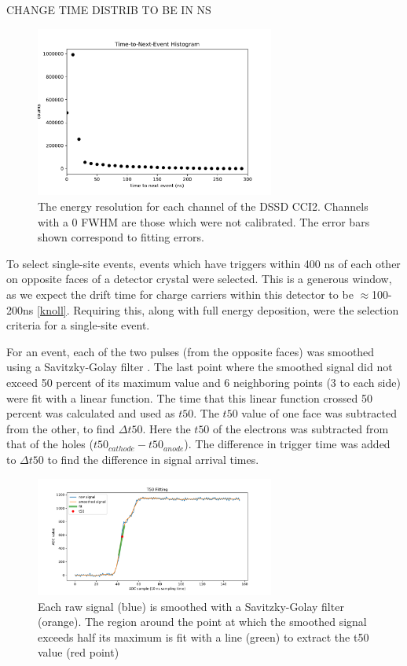 CHANGE TIME DISTRIB TO BE IN NS
\begin{figure}[h]
\begin{centering}
\includegraphics[width=0.7\textwidth]{./figures/time-to-next-event.pdf}
\caption{The energy resolution for each channel of the DSSD CCI2. Channels with a 0 FWHM are those which were not calibrated. The error bars shown correspond to fitting errors.}
\label{timehist}
\end{centering}
\end{figure}

To select single-site events, events which have triggers within 400 ns of each other on opposite faces of a detector crystal were selected. This is a generous window, as we expect the drift time for charge carriers within this detector to be $\approx$100-200ns \ref{knoll}. Requiring this, along with full energy deposition, were the selection criteria for a single-site event.

For an event, each of the two pulses (from the opposite faces) was smoothed using a Savitzky-Golay filter \cite{scipy}. The last point where the smoothed signal did not exceed 50 percent of its maximum value and 6 neighboring points (3 to each side) were fit with a linear function. The time that this linear function crossed 50 percent was calculated and used as $t50$. The $t50$ value of one face was subtracted from the other, to find $\Delta t50$. Here the $t50$ of the electrons was subtracted from that of the holes ($t50_{cathode}- t50_{anode}$). The difference in trigger time was added to $\Delta t50$ to find the difference in signal arrival times.

\begin{figure}[h]
\begin{centering}
\includegraphics[width=0.7\textwidth]{./figures/t50_fitting.pdf}
\caption{Each raw signal (blue) is smoothed with a Savitzky-Golay filter (orange). The region around the point at which the smoothed signal exceeds half its maximum is fit with a line (green) to extract the t50 value (red point)}
\label{fit}
\end{centering}
\end{figure}

